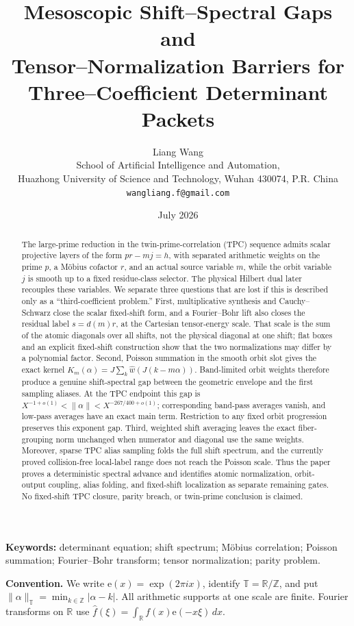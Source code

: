 \documentclass[11pt]{article}
\title{\bfseries Mesoscopic Shift--Spectral Gaps and\\
Tensor--Normalization Barriers for\\
Three--Coefficient Determinant Packets}
\author{Liang Wang\\
\small School of Artificial Intelligence and Automation,\\[-2pt]
\small Huazhong University of Science and Technology, Wuhan 430074, P.R. China\\
\small \texttt{wangliang.f@gmail.com}}
\date{July 2026}
\theoremstyle{definition}
\theoremstyle{remark}
\newcommand{\R}{\mathbb R}
\newcommand{\T}{\mathbb T}
\newcommand{\Z}{\mathbb Z}
\newcommand{\e}{\mathrm e}
\begin{document}
\maketitle

\begin{abstract}
The large-prime reduction in the twin-prime-correlation (TPC) sequence
admits scalar projective layers of the form \(pr-mj=h\), with separated
arithmetic weights on the prime \(p\), a M\"obius cofactor \(r\), and
an actual source variable \(m\), while the orbit variable \(j\) is
smooth up to a fixed residue-class selector.  The physical Hilbert
dual later recouples these variables.  We separate three
questions that are lost if this is described
only as a ``third-coefficient problem.''  First, multiplicative
synthesis and Cauchy--Schwarz close the scalar fixed-shift form, and a
Fourier--Bohr lift also closes the residual label \(s=d(m)r\), at the
Cartesian tensor-energy scale.  That scale is the sum of the atomic
diagonals over all shifts, not the physical diagonal at one shift;
flat boxes and an explicit fixed-shift construction show that the two
normalizations may differ by a polynomial factor.  Second, Poisson
summation in the smooth orbit slot gives the exact kernel
\(K_m(\alpha)=J\sum_k\widehat w(J(k-m\alpha))\).  Band-limited orbit
weights therefore produce a genuine shift-spectral gap between the
geometric envelope and the first sampling aliases.  At the TPC endpoint
this gap is \(X^{-1+o(1)}<\|\alpha\|<X^{-267/400+o(1)}\); corresponding
band-pass averages vanish, and low-pass averages have an exact main
term.  Restriction to any fixed orbit progression preserves this
exponent gap.  Third, weighted shift averaging leaves the exact
fiber-grouping norm unchanged when numerator and diagonal use the same
weights.
Moreover, sparse TPC alias sampling folds the full shift spectrum, and
the currently proved collision-free local-label range does not reach
the Poisson scale.  Thus the paper proves a deterministic spectral
advance and identifies atomic normalization, orbit-output coupling, alias
folding, and fixed-shift localization as separate remaining gates.  No
fixed-shift TPC closure, parity breach, or twin-prime conclusion is
claimed.
\end{abstract}

\noindent\textbf{Keywords:} determinant equation; shift spectrum;
M\"obius correlation; Poisson summation; Fourier--Bohr transform;
tensor normalization; parity problem.

\medskip
\noindent\textbf{Convention.}
We write \(\e(x)=\exp(2\pi i x)\), identify
\(\T=\R/\Z\), and put
\(\|\alpha\|_{\T}=\min_{k\in\Z}|\alpha-k|\).
All arithmetic supports at one scale are finite.  Fourier transforms on
\(\R\) use
\(\widehat f(\xi)=\int_{\R}f(x)\e(-x\xi)\,dx\).
\end{document}
